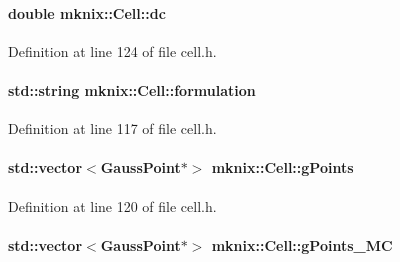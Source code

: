 \hypertarget{classmknix_1_1_cell_a7108fef12b0319adebeff93cab664314}{}
\paragraph[{dc}]{\setlength{\rightskip}{0pt plus 5cm}double mknix\+::\+Cell\+::dc\hspace{0.3cm}{\ttfamily [protected]}}\label{classmknix_1_1_cell_a7108fef12b0319adebeff93cab664314}


Definition at line 124 of file cell.\+h.

\hypertarget{classmknix_1_1_cell_ad637a730575145fbc61f884b2edac8f8}{}
\paragraph[{formulation}]{\setlength{\rightskip}{0pt plus 5cm}std\+::string mknix\+::\+Cell\+::formulation\hspace{0.3cm}{\ttfamily [protected]}}\label{classmknix_1_1_cell_ad637a730575145fbc61f884b2edac8f8}


Definition at line 117 of file cell.\+h.

\hypertarget{classmknix_1_1_cell_a980ae62ad7e6dda296257455ee173f86}{}
\paragraph[{g\+Points}]{\setlength{\rightskip}{0pt plus 5cm}std\+::vector$<${\bf Gauss\+Point}$\ast$$>$ mknix\+::\+Cell\+::g\+Points\hspace{0.3cm}{\ttfamily [protected]}}\label{classmknix_1_1_cell_a980ae62ad7e6dda296257455ee173f86}


Definition at line 120 of file cell.\+h.

\hypertarget{classmknix_1_1_cell_a45f0c5d52208a6166a71e05b190ece44}{}
\paragraph[{g\+Points\+\_\+\+M\+C}]{\setlength{\rightskip}{0pt plus 5cm}std\+::vector$<${\bf Gauss\+Point}$\ast$$>$ mknix\+::\+Cell\+::g\+Points\+\_\+\+M\+C\hspace{0.3cm}{\ttfamily [protected]}}\label{classmknix_1_1_cell_a45f0c5d52208a6166a71e05b190ece44}


